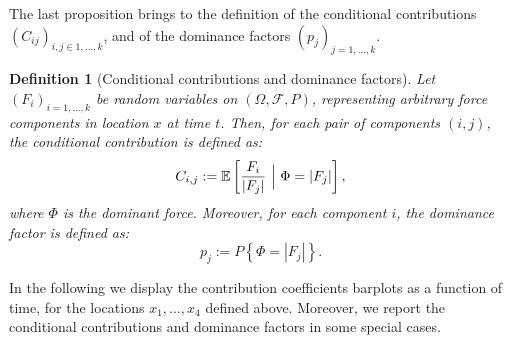 \documentclass{article}
\newtheorem{definition}[theorem]{Definition}
\begin{document}
The last proposition brings to the definition of the conditional contributions $\left(C_{ij}\right)_{i,j\in 1,\dots, k}$, and of the dominance factors $(p_j)_{j=1,\dots, k}$.

\begin{definition}[Conditional contributions and dominance factors]
Let $(F_i)_{i=1,\dots, k}$ be random variables on $(\Omega, \mathcal F, P)$, representing arbitrary force components in location $x$ at time $t$. Then, for each pair of components $(i,j)$, the conditional contribution is defined as:
$$C_{i,j}:=\mathbb E\left[\frac{F_i}{|F_j|}\ \Big{|}\ \Phi=|F_j|\right],$$
where $\Phi$ is the dominant force. Moreover, for each component $i$, the dominance factor is defined as:
$$p_j:=P\left\{\Phi=|F_j|\right\}.$$
\end{definition}

In the following we display the contribution coefficients barplots as a function of time, for the locations $x_1,\dots,x_4$ defined above. Moreover, we report the conditional contributions and dominance factors in some special cases.
\end{document}
